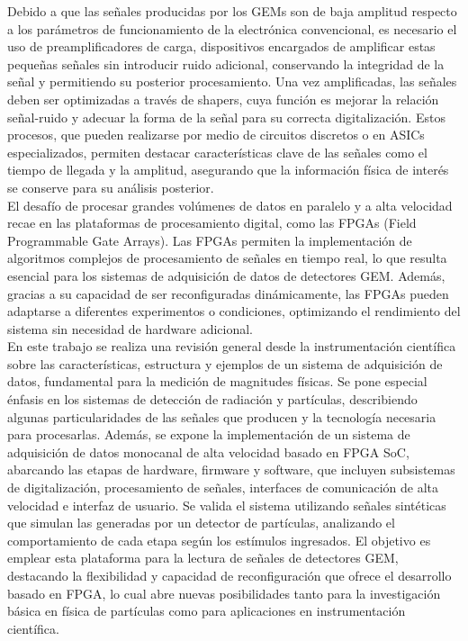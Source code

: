 \documentclass{article}
\begin{document}
\noindent Debido a que las señales producidas por los GEMs son de baja amplitud respecto a los parámetros de funcionamiento de la electrónica convencional, es necesario el uso de preamplificadores de carga, dispositivos encargados de amplificar estas pequeñas señales sin introducir ruido adicional, conservando la integridad de la señal y permitiendo su posterior procesamiento. Una vez amplificadas, las señales deben ser optimizadas a través de shapers, cuya función es mejorar la relación señal-ruido y adecuar la forma de la señal para su correcta digitalización. Estos procesos, que pueden realizarse por medio de circuitos discretos o en ASICs especializados, permiten destacar características clave de las señales como el tiempo de llegada y la amplitud, asegurando que la información física de interés se conserve para su análisis posterior.\\

\noindent El desafío de procesar grandes volúmenes de datos en paralelo y a alta velocidad recae en las plataformas de procesamiento digital, como las FPGAs (Field Programmable Gate Arrays). Las FPGAs permiten la implementación de algoritmos complejos de procesamiento de señales en tiempo real, lo que resulta esencial para los sistemas de adquisición de datos de detectores GEM. Además, gracias a su capacidad de ser reconfiguradas dinámicamente, las FPGAs pueden adaptarse a diferentes experimentos o condiciones, optimizando el rendimiento del sistema sin necesidad de hardware adicional.\\

\noindent En este trabajo se realiza una revisión general desde la instrumentación científica sobre las características, estructura y ejemplos de un sistema de adquisición de datos, fundamental para la medición de magnitudes físicas. Se pone especial énfasis en los sistemas de detección de radiación y partículas, describiendo algunas particularidades de las señales que producen y la tecnología necesaria para procesarlas. Además, se expone la implementación de un sistema de adquisición de datos monocanal de alta velocidad basado en FPGA SoC, abarcando las etapas de hardware, firmware y software, que incluyen subsistemas de digitalización, procesamiento de señales, interfaces de comunicación de alta velocidad e interfaz de usuario. Se valida el sistema utilizando señales sintéticas que simulan las generadas por un detector de partículas, analizando el comportamiento de cada etapa según los estímulos ingresados. El objetivo es emplear esta plataforma para la lectura de señales de detectores GEM, destacando la flexibilidad y capacidad de reconfiguración que ofrece el desarrollo basado en FPGA, lo cual abre nuevas posibilidades tanto para la investigación básica en física de partículas como para aplicaciones en instrumentación científica. \\
\end{document}
